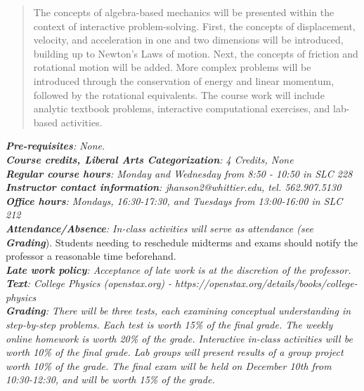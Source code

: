 \documentclass[10pt]{article}
\begin{document}
\maketitle

\begin{abstract}
The concepts of algebra-based mechanics will be presented within the context of interactive problem-solving.  First, the concepts of displacement, velocity, and acceleration in one and two dimensions will be introduced, building up to Newton's Laws of motion.  Next, the concepts of friction and rotational motion will be added.  More complex problems will be introduced through the conservation of energy and linear momentum, followed by the rotational equivalents.  The course work will include analytic textbook problems, interactive computational exercises, and lab-based activities.
\end{abstract}
\noindent
\textit{\textbf{Pre-requisites}: None.} \\
\textit{\textbf{Course credits, Liberal Arts Categorization}: 4 Credits, None} \\
\textit{\textbf{Regular course hours}: Monday and Wednesday from 8:50 - 10:50 in SLC 228} \\
\textit{\textbf{Instructor contact information}: jhanson2@whittier.edu, tel. 562.907.5130} \\
\textit{\textbf{Office hours}: Mondays, 16:30-17:30, and Tuesdays from 13:00-16:00 in SLC 212} \\
\textit{\textbf{Attendance/Absence}: In-class activities will serve as attendance (see \textit{\textbf{Grading}}}).  Students needing to reschedule midterms and exams should notify the professor a reasonable time beforehand. \\
\textit{\textbf{Late work policy}: Acceptance of late work is at the discretion of the professor.} \\
\textit{\textbf{Text}: College Physics (openstax.org) -  https://openstax.org/details/books/college-physics} \\
\textit{\textbf{Grading}: There will be three tests, each examining conceptual understanding in step-by-step problems. Each test is worth 15\% of the final grade. The weekly online homework is worth 20\% of the grade. Interactive in-class activities will be worth 10\% of the final grade. Lab groups will present results of a group project worth 10\% of the grade. The final exam will be held on December 10th from 10:30-12:30, and will be worth 15\% of the grade.} \\
\end{document}
